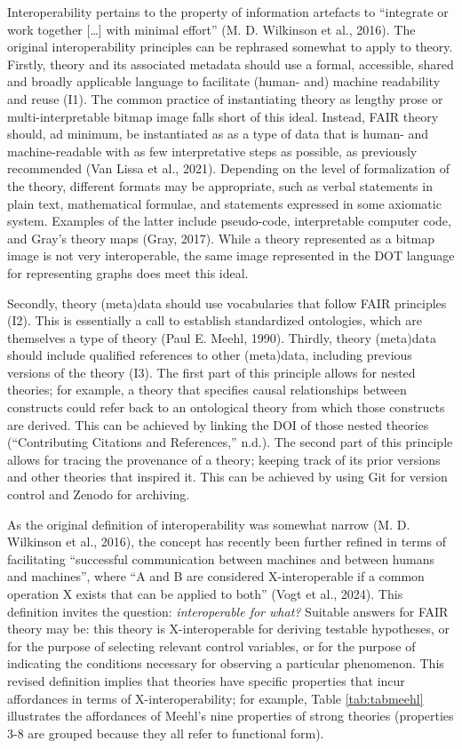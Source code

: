 \documentclass[
  man,floatsintext]{apa6}
\begin{document}
Interoperability pertains to the property of information artefacts to ``integrate or work together {[}\ldots{]} with minimal effort'' (M. D. Wilkinson et al., 2016).
The original interoperability principles can be rephrased somewhat to apply to theory.
Firstly, theory and its associated metadata should use a formal, accessible, shared and broadly applicable language to facilitate (human- and) machine readability and reuse (I1).
The common practice of instantiating theory as lengthy prose or multi-interpretable bitmap image falls short of this ideal.
Instead, FAIR theory should, ad minimum,
be instantiated as
as a type of data that is human- and machine-readable with as few interpretative steps as possible,
as previously recommended (Van Lissa et al., 2021).
Depending on the level of formalization of the theory,
different formats may be appropriate,
such as verbal statements in plain text,
mathematical formulae,
and statements expressed in some axiomatic system.
Examples of the latter include pseudo-code,
interpretable computer code,
and Gray's theory maps (Gray, 2017).
While a theory represented as a bitmap image is not very interoperable,
the same image represented in the DOT language for representing graphs does meet this ideal.

Secondly, theory (meta)data should use vocabularies that follow FAIR principles (I2).
This is essentially a call to establish standardized ontologies,
which are themselves a type of theory (Paul E. Meehl, 1990).
Thirdly, theory (meta)data should include qualified references to other (meta)data, including previous versions of the theory (I3).
The first part of this principle allows for nested theories;
for example, a theory that specifies causal relationships between constructs could refer back to an ontological theory from which those constructs are derived.
This can be achieved by linking the DOI of those nested theories ({``Contributing {Citations} and {References},''} n.d.).
The second part of this principle allows for tracing the provenance of a theory; keeping track of its prior versions and other theories that inspired it.
This can be achieved by using Git for version control and Zenodo for archiving.

As the original definition of interoperability was somewhat narrow (M. D. Wilkinson et al., 2016),
the concept has recently been further refined in terms of facilitating ``successful communication between machines and between humans and machines'', where ``A and B are considered X-interoperable if a common operation X exists that can be applied to both'' (Vogt et al., 2024).
This definition invites the question: \emph{interoperable for what?}
Suitable answers for FAIR theory may be:
this theory is X-interoperable for deriving testable hypotheses,
or for the purpose of selecting relevant control variables,
or for the purpose of indicating the conditions necessary for observing a particular phenomenon.
This revised definition implies that theories have specific properties that incur affordances in terms of X-interoperability;
for example, Table \ref{tab:tabmeehl} illustrates the affordances of Meehl's nine properties of strong theories (properties 3-8 are grouped because they all refer to functional form).
\end{document}
